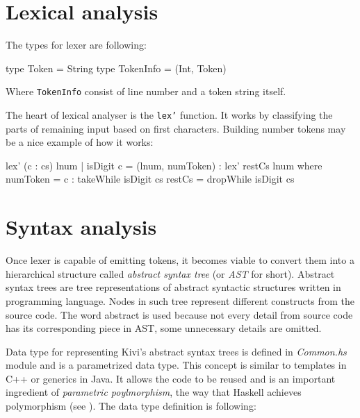 \documentclass[12pt,a4paper]{report}
\begin{document}
\section{Lexical analysis}

The types for lexer are following:

\vspace*{0.2in}
\begin{code}[style=haskell]
  type Token = String
  type TokenInfo = (Int, Token)
\end{code}

Where \texttt{TokenInfo} consist of line number and a token string itself.

The heart of lexical analyser is the \texttt{lex'} function. It works by
classifying the parts of remaining input based on first characters.  Building
number tokens may be a nice example of how it works:

\vspace*{0.2in}
\begin{code}[style=haskell,label=lst:lex_comment,caption={Building tokens from numbers.}]
  lex' (c : cs) lnum | isDigit c =
      (lnum, numToken) : lex' restCs lnum
      where
          numToken = c : takeWhile isDigit cs
          restCs = dropWhile isDigit cs
\end{code}


\section{Syntax analysis}
\label{sec:syntax_analysis}
Once lexer is capable of emitting tokens, it becomes viable to convert them
into a hierarchical structure called \textit{abstract syntax tree} (or
\textit{AST} for short). Abstract syntax trees are tree representations of
abstract syntactic structures written in programming language. Nodes in such
tree represent different constructs from the source code. The word abstract is
used because not every detail from source code has its corresponding piece in
AST, some unnecessary details are omitted.

Data type for representing Kivi's abstract syntax trees is defined in
\textit{Common.hs} module and is a parametrized data type. This concept is
similar to templates in C++ or generics in Java. It allows the code to be
reused and is an important ingredient of \textit{parametric poylmorphism}, the
way that Haskell achieves polymorphism (see
\cite{website:parametric_polymorphism}). The data type definition is following:
\end{document}
